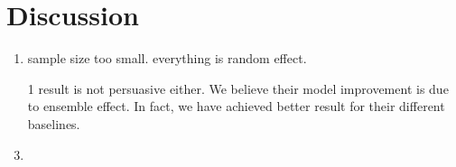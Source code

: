 
\section{Discussion}

\begin{enumerate}
	\item sample size too small. everything is random effect.
	\item [1] result is not persuasive either. We believe their model improvement is due to ensemble effect. In fact, we have achieved better result for their different baselines.
	\item 
\end{enumerate}
